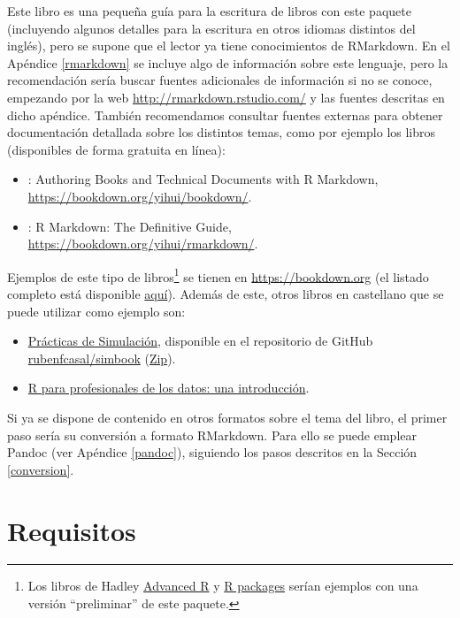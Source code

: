 \documentclass[]{book}
\let\rmarkdownfootnote\footnote%
\def\footnote{\protect\rmarkdownfootnote}
\theoremstyle{definition}
\theoremstyle{definition}
\theoremstyle{definition}
\theoremstyle{remark}
\begin{document}
Este libro es una pequeña guía para la escritura de libros con este
paquete (incluyendo algunos detalles para la escritura en otros idiomas
distintos del inglés), pero se supone que el lector ya tiene
conocimientos de RMarkdown. En el Apéndice \ref{rmarkdown} se incluye
algo de información sobre este lenguaje, pero la recomendación sería
buscar fuentes adicionales de información si no se conoce, empezando por
la web \url{http://rmarkdown.rstudio.com/} y las fuentes descritas en
dicho apéndice. También recomendamos consultar fuentes externas para
obtener documentación detallada sobre los distintos temas, como por
ejemplo los libros (disponibles de forma gratuita en línea):

\begin{itemize}
\item
  \citet{R-bookdown} : Authoring Books and Technical Documents with R
  Markdown, \url{https://bookdown.org/yihui/bookdown/}.
\item
  \citet{xie2018r} : R Markdown: The Definitive Guide,
  \url{https://bookdown.org/yihui/rmarkdown/}.
\end{itemize}

Ejemplos de este tipo de libros\footnote{Los libros de Hadley
  \href{http://adv-r.had.co.nz}{Advanced R} y
  \href{http://r-pkgs.had.co.nz}{R packages} serían ejemplos con una
  versión ``preliminar'' de este paquete.} se tienen en
\url{https://bookdown.org} (el listado completo está disponible
\href{https://bookdown.org/home/archive/}{aquí}). Además de este, otros
libros en castellano que se puede utilizar como ejemplo son:

\begin{itemize}
\item
  \href{https://rubenfcasal.github.io/simbook}{Prácticas de Simulación},
  disponible en el repositorio de GitHub
  \href{https://github.com/rubenfcasal/simbook}{rubenfcasal/simbook}
  (\href{https://github.com/rubenfcasal/simbook/archive/master.zip}{Zip}).
\item
  \href{https://www.datanalytics.com/libro_r/index.html}{R para
  profesionales de los datos: una introducción}.
\end{itemize}

Si ya se dispone de contenido en otros formatos sobre el tema del libro,
el primer paso sería su conversión a formato RMarkdown. Para ello se
puede emplear Pandoc (ver Apéndice \ref{pandoc}), siguiendo los pasos
descritos en la Sección \ref{conversion}.

\section{Requisitos}\label{requisitos}
\end{document}
